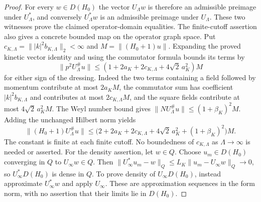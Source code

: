\documentclass[11pt,a4paper]{article}
\theoremstyle{definition}
\theoremstyle{remark}
\begin{document}
\begin{proof}
For every $w\in D(H_0)$ the vector $U_\Lambda w$ is therefore
an admissible preimage under $U_\Lambda^*$, and conversely
$U_\Lambda^*w$ is an admissible preimage under $U_\Lambda$.
These two witnesses prove the claimed operator-domain equalities.
The finite-cutoff assertion also gives a concrete bounded map on the
operator graph space. Put
$c_{K,\Lambda}=\||k|^2b_{K,\Lambda}\|_2<\infty$ and
$M=\|(H_0+1)u\|$. Expanding the proved kinetic vector identity
and using the commutator formula bounds its terms by
\[
 \|p^2U_\Lambda^{\#}u\|
 \leq(1+2a_K+2c_{K,\Lambda}+4\sqrt2\,a_K^2)M
\]
for either sign of the dressing. Indeed the two terms containing a
field followed by momentum contribute at most $2a_KM$, the
commutator sum has coefficient $|k|^2b_{K,\Lambda}$ and
contributes at most $2c_{K,\Lambda}M$, and the square fields
contribute at most $4\sqrt2\,a_K^2M$.
The Weyl number bound gives
$\|NU_\Lambda^{\#}u\|\leq(1+\beta_K)^2M$.
Adding the unchanged Hilbert norm yields
\[
 \|(H_0+1)U_\Lambda^{\#}u\|
 \leq\bigl(2+2a_K+2c_{K,\Lambda}
           +4\sqrt2\,a_K^2+(1+\beta_K)^2\bigr)M.
\]
The constant is finite at each finite cutoff. No boundedness of
$c_{K,\Lambda}$ as $\Lambda\to\infty$ is needed or asserted.
For the density assertion, let $w\in Q$. Choose $u_m\in D(H_0)$
converging in $Q$ to $U_\infty w\in Q$. Then
$\|U_\infty^*u_m-w\|_Q\leq L_K\|u_m-U_\infty w\|_Q\to0$,
so $U_\infty^*D(H_0)$ is dense in $Q$. To prove density of
$U_\infty D(H_0)$, instead approximate $U_\infty^*w$ and
apply $U_\infty$. These are approximation sequences in the form
norm, with no assertion that their limits lie in $D(H_0)$.


\end{proof}
\end{document}
